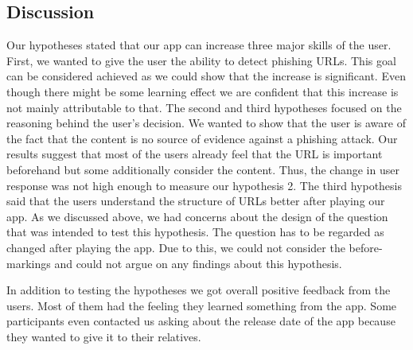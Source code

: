 \subsection{Discussion}
Our hypotheses stated that our app can increase three major skills of the user.
First, we wanted to give the user the ability to detect phishing URLs.
This goal can be considered achieved as we could show that the increase is significant.
Even though there might be some learning effect we are confident that this increase is not mainly attributable to that.
The second and third hypotheses focused on the reasoning behind the user's decision.
We wanted to show that the user is aware of the fact that the content is no source of evidence against a phishing attack.
Our results suggest that most of the users already feel that the URL is important beforehand but some additionally consider the content.
Thus, the change in user response was not high enough to measure our hypothesis 2. 
The third hypothesis said that the users understand the structure of URLs better after playing our app.
As we discussed above, we had concerns about the design of the question that was intended to test this hypothesis.
The question has to be regarded as changed after playing the app.
Due to this, we could not consider the before-markings and could not argue on any findings about this hypothesis.

In addition to testing the hypotheses we got overall positive feedback from the users.
Most of them had the feeling they learned something from the app.
Some participants even contacted us asking about the release date of the app because they wanted to give it to their relatives.

